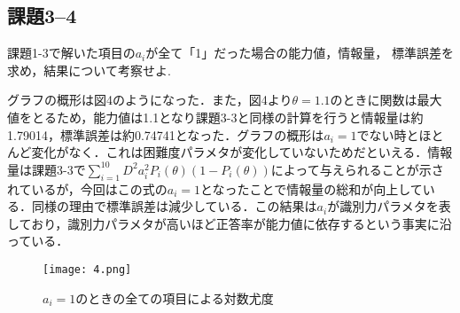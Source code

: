 \documentclass[12pt]{jarticle}
\begin{document}
\subsection{課題3–4}
\begin{shadebox}
    \quad 課題1-3で解いた項目の$a_i$が全て「1」だった場合の能力値，情報量，
    標準誤差を求め，結果について考察せよ.
\end{shadebox}
\vspace{\baselineskip}
グラフの概形は図4のようになった．また，図4より$\theta=1.1$のときに関数は最大値をとるため，能力値は1.1となり課題3-3と同様の計算を行うと情報量は約1.79014，標準誤差は約0.74741となった．グラフの概形は$a_i=1$でない時とほとんど変化がなく．これは困難度パラメタが変化していないためだといえる．情報量は課題3-3で$\sum_{i=1}^{10}{D^2a_i^2P_i(\theta)(1-P_i(\theta))}$によって与えられることが示されているが，今回はこの式の$a_i=1$となったことで情報量の総和が向上している．同様の理由で標準誤差は減少している．この結果は$a_i$が識別力パラメタを表しており，識別力パラメタが高いほど正答率が能力値に依存するという事実に沿っている．
\begin{figure}[H]
    \begin{center}
        \texttt{[image: 4.png]}
    \end{center}
    \caption{$a_i=1$のときの全ての項目による対数尤度}
    \label{fig1}
\end{figure}
\end{document}
